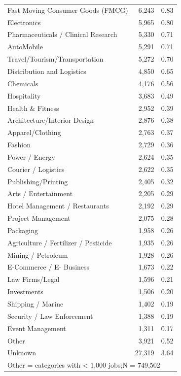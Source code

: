 \begin{tabular}{lrr}
Fast Moving Consumer Goods (FMCG)&       6,243&        0.83\\
Electronics         &       5,965&        0.80\\
Pharmaceuticals / Clinical Research&       5,330&        0.71\\
AutoMobile          &       5,291&        0.71\\
Travel/Tourism/Transportation&       5,272&        0.70\\
Distribution and Logistics&       4,850&        0.65\\
Chemicals           &       4,176&        0.56\\
Hospitality         &       3,683&        0.49\\
Health \& Fitness   &       2,952&        0.39\\
Architecture/Interior Design&       2,876&        0.38\\
Apparel/Clothing    &       2,763&        0.37\\
Fashion             &       2,729&        0.36\\
Power / Energy      &       2,624&        0.35\\
Courier / Logistics &       2,622&        0.35\\
Publishing/Printing &       2,405&        0.32\\
Arts / Entertainment&       2,205&        0.29\\
Hotel Management / Restaurants&       2,192&        0.29\\
Project Management  &       2,075&        0.28\\
Packaging           &       1,958&        0.26\\
Agriculture / Fertilizer / Pesticide&       1,935&        0.26\\
Mining / Petroleum  &       1,928&        0.26\\
E-Commerce / E- Business&       1,673&        0.22\\
Law Firms/Legal     &       1,596&        0.21\\
Investments         &       1,506&        0.20\\
Shipping / Marine   &       1,402&        0.19\\
Security / Law Enforcement&       1,388&        0.19\\
Event Management    &       1,311&        0.17\\
Other               &       3,921&        0.52\\
Unknown             &      27,319&        3.64\\
\midrule


\multicolumn{3}{l}{\footnotesize Other = categories with < 1{,}000 jobs;\quad N =      749,502}\\


\bottomrule


\end{tabular}


